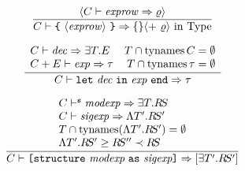 


\begin{equation}	%
\frac{\langle\C\ts\labexps\ra\varrho\rangle}
     {\C\ts\ttlbrace\ \recexp\ \ttrbrace\ra\emptymap\langle +\ \varrho\rangle{\rm\ in\ \Type}}\index{27.0}
\end{equation}


 \begin{equation}        %
 \label{let-rule}
 \frac{\begin{array}{lr}
       \C\ts\dec\ra\EXISTS{\T}{\E} &
       \T \cap \TyNamesFcn \C = \emptyset \\
       \C + \E\ts\exp\ra\tau &
       \T \cap \TyNamesFcn \tau = \emptyset \\
      \end{array}}
      {\C\ts\letexp\ra\tau}\index{27.1}
 \end{equation}


\begin{equation}        %
\label{structureatexp-rule}
 \frac{\begin{array}{l}
       \C\ts^\expectstr\modexp\ra\exmod{\T}{\RS} \\
       \C\ts\sigexp\ra\sig{\T'}{\RS'} \\
       \T \cap \TyNamesFcn (\sig{\T'}{\RS'}) = \emptyset \\
       \siginstantiates{\sig{\T'}{\RS'}}{\RS''}\prec\RS\\ 
      \end{array}}
      {\C\ts\structureatexp\ra\packagetype{\exmod{\T'}{\RS'}}}%
\end{equation}

